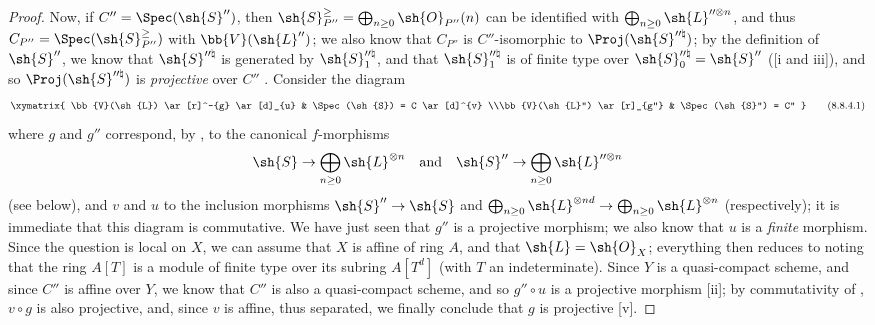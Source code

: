 \begin{proof}
Now, if $C''=\Spec(\sh{S}'')$, then $\sh{S}_{P''}^\geq=\bigoplus_{n\geq 0}\sh{O}_{P''}(n)$ can be identified with $\bigoplus_{n\geq 0}\sh{L}^{\prime\prime\otimes n}$, and thus $C_{P''}=\Spec(\sh{S}_{P''}^\geq)$ with $\bb{V}(\sh{L}'')$;
we also know  that $C_{P''}$ is $C''$-isomorphic to $\Proj(\sh{S}^{\prime\prime\natural})$;
by the definition of $\sh{S}''$, we know that $\sh{S}^{\prime\prime\natural}$ is generated by $\sh{S}_1^{\prime\prime\natural}$, and that $\sh{S}_1^{\prime\prime\natural}$ is of finite type over $\sh{S}_0^{\prime\prime\natural}=\sh{S}''$ ([i and iii]), and so $\Proj(\sh{S}^{\prime\prime\natural})$ is \emph{projective} over $C''$ .
Consider the diagram
\[
\label{II.8.8.4.1}
  \xymatrix{
    \bb{V}(\sh{L})
      \ar[r]^-{g}
      \ar[d]_{u}
  & \Spec(\sh{S}) = C
      \ar[d]^{v}
  \\\bb{V}(\sh{L}'')
      \ar[r]_{g''}
  & \Spec(\sh{S}'') = C''
  }
  \tag{8.8.4.1}
\]
where $g$ and $g''$ correspond, by , to the canonical $f$-morphisms
\[
  \sh{S}\to\bigoplus_{n\geq0}\sh{L}^{\otimes n}
  \quad\mbox{and}\quad
  \sh{S}''\to\bigoplus_{n\geq0}\sh{L}^{\prime\prime\otimes n}
\]
 (see  below), and $v$ and $u$ to the inclusion morphisms $\sh{S}''\to\sh{S}$ and $\bigoplus_{n\geq0}\sh{L}^{\otimes nd}\to\bigoplus_{n\geq0}\sh{L}^{\otimes n}$ (respectively);
it is immediate  that this diagram is commutative.
We have just seen that $g''$ is a projective morphism;
we also know that $u$ is a \emph{finite} morphism.
Since the question is local on $X$, we can assume that $X$ is affine of ring $A$, and that $\sh{L}=\sh{O}_X$;
everything then reduces to noting that the ring $A[T]$ is a module of finite type over its subring $A[T^d]$ (with $T$ an indeterminate).
Since $Y$ is a quasi-compact scheme, and since $C''$ is affine over $Y$, we know that $C''$ is also a quasi-compact scheme,
and so $g''\circ u$ is a projective morphism [ii];
by commutativity of , $v\circ g$ is also projective, and, since $v$ is affine, thus separated, we finally conclude that $g$ is projective [v].
\end{proof}

